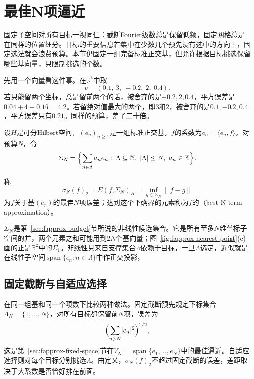 \section{最佳N项逼近}
\label{sec:fapprox-best-n-term}

固定子空间对所有目标一视同仁：截断Fourier级数总是保留低频，固定网格总是在同样的位置细分。目标的重要信息若集中在少数几个预先没有选中的方向上，固定选法就会浪费预算。本节仍固定一组完备标准正交基，但允许根据目标挑选保留哪些基向量，只限制挑选的个数。

先用一个向量看这件事。在$\mathbb R^5$中取
\[
 v=(0.1,\ 3,\ -0.2,\ 2,\ 0.4).
\]
若只能留两个坐标，总是留前两个的话，被舍弃的是$-0.2,2,0.4$，平方误差是$0.04+4+0.16=4.2$。若留绝对值最大的两个，即$3$和$2$，被舍弃的是$0.1,-0.2,0.4$，平方误差只有$0.21$。同样的预算，差了二十倍。

设$H$是可分Hilbert空间，$(e_n)_{n\geq1}$是一组标准正交基，$f$的系数为$c_n=\langle e_n,f\rangle$。对预算$N$，令
\[
 \Sigma_N=\Bigl\{\sum_{n\in\Lambda}a_ne_n:\ \Lambda\subseteq\mathbb N,\ \lvert\Lambda\rvert\leq N,\ a_n\in\mathbb K\Bigr\}.
\]

\begin{definition}[最佳N项逼近]
\label{def:fapprox-best-n-term}
称
\begin{equation}
 \sigma_N(f)_2=E(f,\Sigma_N)_H=\inf_{g\in\Sigma_N}\lVert f-g\rVert
 \label{eq:fapprox-best-n-term}
\end{equation}
为$f$关于基$(e_n)$的最佳$N$项误差；达到这个下确界的元素称为$f$的（best N-term approximation）。
\end{definition}

$\Sigma_N$是第~\ref{sec:fapprox-budget}节所说的非线性候选集合。它是所有至多$N$维坐标子空间的并，两个元素之和可能用到$2N$个基向量；图~\ref{fig:fapprox-nearest-point}(c)画的正是$\mathbb R^2$中的$\Sigma_1$。非线性只来自支撑集合$\Lambda$依赖于目标，一旦$\Lambda$选定，近似就是在线性子空间$\operatorname{span}\{e_n:n\in\Lambda\}$中作正交投影。

\subsection{固定截断与自适应选择}
\label{sec:fapprox-fixed-vs-adaptive}

在同一组基和同一个项数下比较两种做法。固定截断预先规定下标集合$\Lambda_N=\{1,\ldots,N\}$，对所有目标都保留前$N$项，误差为
\[
 \Bigl(\sum_{n>N}\lvert c_n\rvert^2\Bigr)^{1/2},
\]
这是第~\ref{sec:fapprox-fixed-space}节在$V_N=\operatorname{span}\{e_1,\ldots,e_N\}$中的最佳逼近。自适应选择则对每个目标分别挑选$\Lambda$。由定义，$\sigma_N(f)_2$不超过固定截断的误差，差距取决于大系数是否恰好排在前面。

